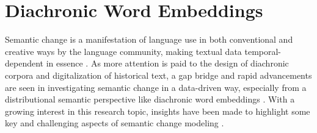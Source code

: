 \section{Diachronic Word Embeddings}
Semantic change is a manifestation of language use in both conventional and creative ways by the language community, making textual data temporal-dependent in essence \parencite{kutuzov2018survey}. As more attention is paid to the design of diachronic corpora and digitalization of historical text, a gap bridge and rapid advancements are seen in investigating semantic change in a data-driven way, especially from a distributional semantic perspective like diachronic word embeddings \parencite{kutuzov2018survey, tahmasebi2018survey, hamilton2016law}. With a growing interest in this research topic, insights have been made to highlight some key and challenging aspects of semantic change modeling \parencite{kutuzov2018survey,tahmasebi2018survey,camacho2018survey}. 

